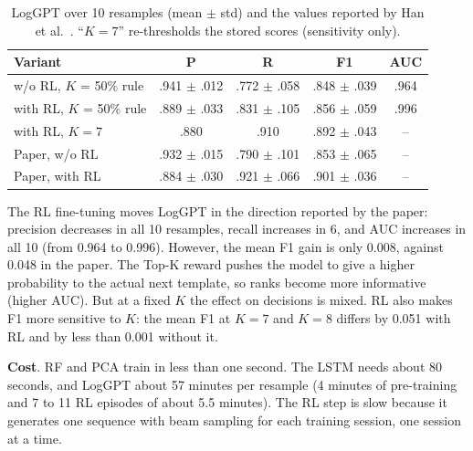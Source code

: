 \documentclass[10pt, conference]{IEEEtran}
\renewcommand{\paragraph}[1]{\noindent\textbf{#1}.}
\begin{document}
\begin{table}[t]
\centering
\caption{LogGPT over 10 resamples (mean $\pm$ std) and the values reported by Han et al.~\cite{han2023loggpt}. ``$K=7$'' re-thresholds the stored scores (sensitivity only).}
\label{tab:loggpt}
\footnotesize
\setlength{\tabcolsep}{2pt}
\begin{tabular}{lcccc}
\toprule
Variant & P & R & F1 & AUC \\
\midrule
w/o RL, $K$ = 50\% rule & .941 $\pm$ .012 & .772 $\pm$ .058 & .848 $\pm$ .039 & .964 \\
with RL, $K$ = 50\% rule & .889 $\pm$ .033 & .831 $\pm$ .105 & .856 $\pm$ .059 & .996 \\
with RL, $K=7$ & .880 & .910 & .892 $\pm$ .043 & -- \\
\midrule
Paper, w/o RL & .932 $\pm$ .015 & .790 $\pm$ .101 & .853 $\pm$ .065 & -- \\
Paper, with RL & .884 $\pm$ .030 & .921 $\pm$ .066 & .901 $\pm$ .036 & -- \\
\bottomrule
\end{tabular}
\end{table}

The RL fine-tuning moves LogGPT in the direction reported by the paper: precision decreases in all 10 resamples, recall increases in 6, and AUC increases in all 10 (from 0.964 to 0.996). However, the mean F1 gain is only 0.008, against 0.048 in the paper. The Top-K reward pushes the model to give a higher probability to the actual next template, so ranks become more informative (higher AUC). But at a fixed $K$ the effect on decisions is mixed. RL also makes F1 more sensitive to $K$: the mean F1 at $K=7$ and $K=8$ differs by 0.051 with RL and by less than 0.001 without it.

\paragraph{Cost} RF and PCA train in less than one second. The LSTM needs about 80 seconds, and LogGPT about 57 minutes per resample (4 minutes of pre-training and 7 to 11 RL episodes of about 5.5 minutes). The RL step is slow because it generates one sequence with beam sampling for each training session, one session at a time.
\end{document}

